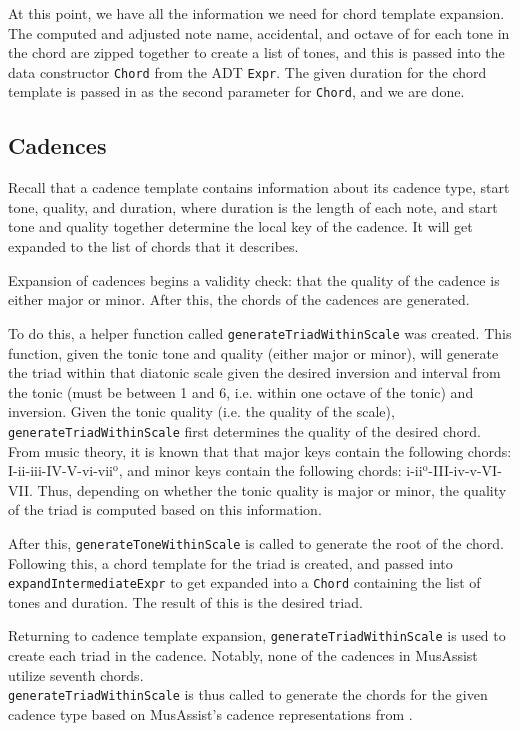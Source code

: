 \documentclass{report}
\begin{document}
At this point,  we have all the information we need for chord template expansion. The computed and adjusted note name, accidental, and octave of for each tone in the chord are zipped together to create a list of  tones, and this is passed into the data constructor \verb.Chord. from the ADT \verb.Expr.. The given duration  for the chord template is passed in as the second parameter for \verb.Chord., and we are done.


\subsection{Cadences}
Recall that a cadence template contains information about its cadence type, start tone, quality, and duration, where duration is the length of each note, and start tone and quality together determine the local key of the cadence. It will get expanded to the list of chords that it describes.

Expansion of cadences begins a validity check: that the quality of the cadence is either major or minor. After this, the chords of the cadences are generated.

To do this, a helper function called \verb.generateTriadWithinScale. was created. This function, given the tonic tone and quality (either major or minor), will generate the triad within that diatonic scale given the desired inversion and interval from the tonic (must be between 1 and 6, i.e. within one octave of the tonic) and inversion. Given the tonic quality (i.e. the quality of the scale), \verb.generateTriadWithinScale. first determines the quality of the desired chord. From music theory, it is known that that major keys contain the following chords: I-ii-iii-IV-V-vi-vii$^\text{o}$, and minor keys contain the following chords: i-ii$^\text{o}$-III-iv-v-VI-VII. Thus, depending on whether the tonic quality is major or minor, the quality of the triad is computed based on this information.

After this, \verb.generateToneWithinScale. is called to  generate the root of the chord. Following this, a chord template for the triad is created, and passed into \verb.expandIntermediateExpr. to get expanded into a \verb.Chord. containing the list of tones and duration. The result of this is the desired triad.

Returning to cadence template expansion, \verb.generateTriadWithinScale. is used to create each triad in  the cadence. Notably, none of the cadences in MusAssist utilize seventh chords. 
\\\verb.generateTriadWithinScale. is thus called to generate the chords for the given cadence type based on MusAssist's cadence representations from . 
\end{document}
